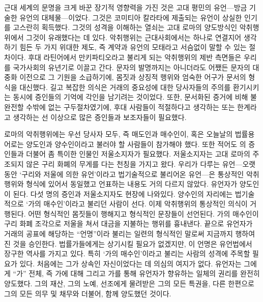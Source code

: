 근대 세계의 문명을 크게 바꾼 장기적 영향력을 가진 것은
고대 평민의 유언---방금 기술한 유언의 대체물---이었다.
그것은 코미티아 칼라타에 제출되는 유언이 상실한 인기를 고스란히 획득했다.
그것의 성격을 이해하는 열쇠는
고대 로마의 양도방식인
악취행위에서
그것이
유래했다는 데 있다.
악취행위는 근대사회에서는 하나로 연결지어 생각하기 힘든
두 가지 위대한 제도, 즉 계약과 유언의 모태라고 서슴없이 말할 수 있는 절차이다.
후대 라틴어에서 만키파티오라고 불리게 되는
악취행위의 제반 측면들은 우리를 국가사회의 유년기로 이끌고 간다.
문자의 발명까지는 아니더라도 어쨌든 문자의 대중화 이전으로
그 기원을 소급하기에,
몸짓과 상징적 행위와 엄숙한 어구가 문서의 형식을 대신했다.
길고 복잡한 의식은 거래의 중요성에 대한
당사자들의 주의를 환기시키는 동시에 증인들의 기억에 각인을 남기려는 것이었다.
또한, 문서화된 증거에 비해 불완전할 수밖에 없는 구두절차였기에,
후대 사람들이 적절하다고 생각하는 또는 한계라고 생각하는 선 이상으로 많은
증인들과 보조자들이 필요했다.

로마의 악취행위에는 우선 당사자 모두, 즉 매도인과 매수인이,
혹은 오늘날의 법률용어로는 양도인과 양수인이라고 불러야 할 사람들이
참가해야 했다.
또한 적어도 의 증인들과 더불어 좀 특이한 인물인
저울소지자가 필요했다.
저울소지자는 고대 로마의 주조되지 않은 구리 화폐의 무게를 다는
천칭을 가지고 왔다.
우리가 다루는 유언---오랫동안
`구리와 저울에 의한 유언'이라고
법기술적으로 불리어온 유언---은
통상적인 악취행위와 형식에 있어서 동일했고
언표하는 내용도 거의 다르지 않았다.
유언자가 양도인이 된다.
다섯 명의 증인과 저울소지자도 현장에 나와있다.
양수인의 자리에는 법기술적으로
`가의 매수인'이라고 불리던 사람이 선다.
이제 악취행위의 통상적인 의식이 거행된다.
어떤 형식적인 몸짓들이 행해지고 형식적인 문장들이 선언된다.
가의 매수인이
구리 화폐 조각으로 저울을 쳐서 대금을 지불하는 행위를 흉내낸다.
끝으로 유언자가
거래의 공표에 해당하는 ``언명''이라
불리는 일련의 형식적인 말로써 지금까지 행하여진 것을 승인한다.
법률가들에게는 상기시킬 필요가 없겠지만, 이 언명은
유언법에서 장구한 역사를 가지고 있다.
특히 `가의 매수인'이라고 불리는 사람의 성격에 주목할 필요가 있다.
처음에는 그가 상속인 자신이었다는 데 의심의 여지가 없다.
유언자는 그에게 ``가'' 전체, 즉
가에 대해 그리고 가를 통해 유언자가 향유하는 일체의 권리를 완전히 양도했다.
그의 재산, 그의 노예, 선조에게 물려받은 그의 모든 특권을,
다른 한편으로 그의 모든 의무 및 채무와 더불어, 함께 양도했던 것이다.

